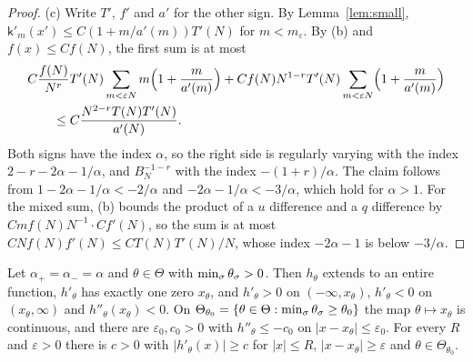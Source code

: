 \begin{proof}
(c) Write $T'$, $f'$ and $a'$ for the other sign. By Lemma~\ref{lem:small},
$\mathsf k'_m(x')\le C(1+m/a'(m))T'(N)$ for $m<m_\varepsilon$. By (b) and $f(x)\le Cf(N)$, the
first sum is at most
\begin{align*}
 &C\frac{f(N)}{N^r}T'(N)\sum_{m<\varepsilon N}m\Bigl(1+\frac m{a'(m)}\Bigr)
 +Cf(N)N^{1-r}T'(N)\sum_{m<\varepsilon N}\Bigl(1+\frac m{a'(m)}\Bigr)\\
 &\qquad\le C\frac{N^{2-r}T(N)T'(N)}{a'(N)}.
\end{align*}
Both signs have the index $\alpha$, so the right side is regularly varying with the index
$2-r-2\alpha-1/\alpha$, and $B_N^{-1-r}$ with the index $-(1+r)/\alpha$. The claim follows from
$1-2\alpha-1/\alpha<-2/\alpha$ and $-2\alpha-1/\alpha<-3/\alpha$, which hold for $\alpha>1$. For
the mixed sum, (b) bounds the product of a $u$ difference and a $q$ difference by
$Cmf(N)N^{-1}\cdot Cf'(N)$, so the sum is at most $CNf(N)f'(N)\le CT(N)T'(N)/N$, whose index
$-2\alpha-1$ is below $-3/\alpha$.
\end{proof}

\begin{lemma}\label{lem:bell}
Let $\alpha_\plus=\alpha_\minus=\alpha$ and $\theta\in\Theta$ with $\min_\sigma\theta_\sigma>0$. Then
$h_\theta$ extends to an entire function, $h'_\theta$ has exactly one zero $x_\theta$, and
$h'_\theta>0$ on $(-\infty,x_\theta)$, $h'_\theta<0$ on $(x_\theta,\infty)$ and
$h''_\theta(x_\theta)<0$. On $\Theta_{\theta_0}=\{\theta\in\Theta:\min_\sigma\theta_\sigma\ge\theta_0\}$
the map $\theta\mapsto x_\theta$ is continuous, and there are $\varepsilon_0,c_0>0$ with
$h''_\theta\le-c_0$ on $|x-x_\theta|\le\varepsilon_0$. For every $R$ and $\varepsilon>0$ there
is $c>0$ with $|h'_\theta(x)|\ge c$ for $|x|\le R$, $|x-x_\theta|\ge\varepsilon$ and
$\theta\in\Theta_{\theta_0}$.
\end{lemma}

